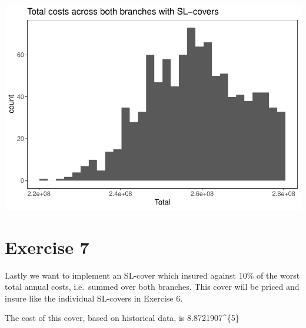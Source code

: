 \documentclass[]{article}
\begin{document}
\includegraphics{Projekt1_files/figure-latex/unnamed-chunk-16-4.pdf}

\section{Exercise 7}\label{exercise-7}

Lastly we want to implement an SL-cover which insured against \(10\%\)
of the worst total annual costs, i.e.~summed over both branches. This
cover will be priced and insure like the individual SL-covers in
Exercise 6.

The cost of this cover, based on historical data, is
8.8721907\^{}\{5\}
\end{document}
